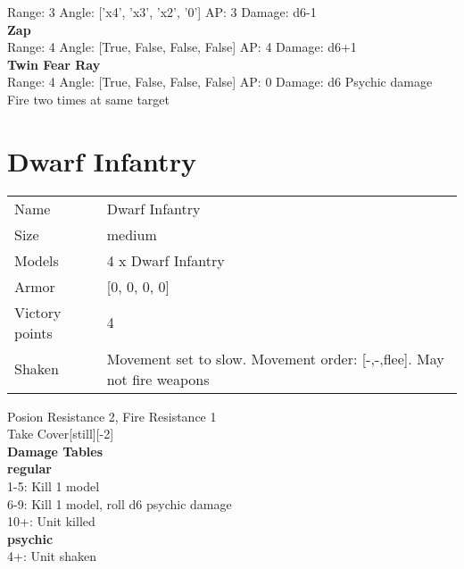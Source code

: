 Range: 3  Angle: ['x4', 'x3', 'x2', '0'] AP: 3 Damage: d6-1 \\




{\bf Zap } \\



Range: 4  Angle: [True, False, False, False] AP: 4 Damage: d6+1 \\




{\bf Twin Fear Ray } \\



Range: 4  Angle: [True, False, False, False] AP: 0 Damage: d6 Psychic damage \\
Fire two times at same target\\ 




 















\clearpage\pagebreak

\section{ Dwarf Infantry }

\begin{tabular}{ll}
  Name & Dwarf Infantry \\
  Size & medium\\
  Models & 4 x Dwarf Infantry\\
  Armor & [0, 0, 0, 0]\\
  Victory points & 4\\
  Shaken & Movement set to slow. Movement order: [-,-,flee]. May not fire weapons\\
\end{tabular}

Posion Resistance 2, Fire Resistance 1\\ 
Take Cover[still][-2]\\ 



{\bf Damage Tables} \\
 {\bf regular } \\
1-5: Kill 1 model \\
6-9: Kill 1 model, roll d6 psychic damage \\
10+: Unit killed \\
 {\bf psychic } \\
4+: Unit shaken \\


